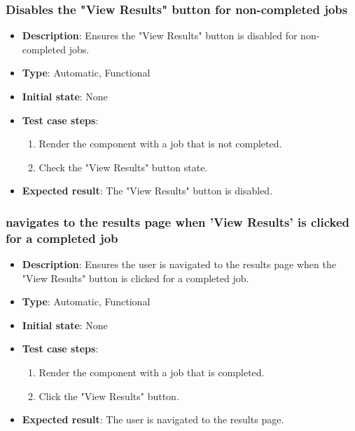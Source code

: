 \documentclass[12pt, titlepage]{article}
\begin{document}
\subsubsection{Disables the "View Results" button for non-completed jobs}
\begin{itemize}
    \item \textbf{Description}: Ensures the "View Results" button is disabled for non-completed jobs.
    \item \textbf{Type}: Automatic, Functional
    \item \textbf{Initial state}: None
    \item \textbf{Test case steps}:
    \begin{enumerate}
        \item Render the component with a job that is not completed.
        \item Check the "View Results" button state.
    \end{enumerate}
    \item \textbf{Expected result}: The "View Results" button is disabled.
\end{itemize}

\subsubsection{navigates to the results page when 'View Results' is clicked for a completed job}
\begin{itemize}
    \item \textbf{Description}: Ensures the user is navigated to the results page when the "View Results" button is clicked for a completed job.
    \item \textbf{Type}: Automatic, Functional
    \item \textbf{Initial state}: None
    \item \textbf{Test case steps}:
    \begin{enumerate}
        \item Render the component with a job that is completed.
        \item Click the "View Results" button.
    \end{enumerate}
    \item \textbf{Expected result}: The user is navigated to the results page.
\end{itemize}
\end{document}
